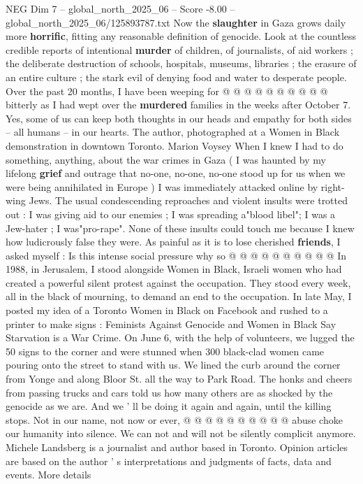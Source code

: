 \begin{textsample}{NEG Dim 7 – global\_north\_2025\_06 – Score -8.00 – global\_north\_2025\_06/125893787.txt}
Now the \textbf{slaughter} in Gaza grows daily more \textbf{horrific}, fitting any reasonable definition of genocide.
Look at the countless credible reports of intentional \textbf{murder} of children, of journalists, of aid workers ; the deliberate destruction of schools, hospitals, museums, libraries ; the erasure of an entire culture ; the stark evil of denying food and water to desperate people.
Over the past 20 months, I have been weeping for @ @ @ @ @ @ @ @ @ @ bitterly as I had wept over the \textbf{murdered} families in the weeks after October 7.
Yes, some of us can keep both thoughts in our heads and empathy for both sides -- all humans -- in our hearts.
The author, photographed at a Women in Black demonstration in downtown Toronto.
Marion Voysey When I knew I had to do something, anything, about the war crimes in Gaza ( I was haunted by my lifelong \textbf{grief} and outrage that no-one, no-one, no-one stood up for us when we were being annihilated in Europe ) I was immediately attacked online by right-wing Jews.
The usual condescending reproaches and violent insults were trotted out : I was giving aid to our enemies ; I was spreading a"blood libel"; I was a Jew-hater ; I was"pro-rape".
None of these insults could touch me because I knew how ludicrously false they were.
As painful as it is to lose cherished \textbf{friends}, I asked myself : Is this intense social pressure why so @ @ @ @ @ @ @ @ @ @ In 1988, in Jerusalem, I stood alongside Women in Black, Israeli women who had created a powerful silent protest against the occupation.
They stood every week, all in the black of mourning, to demand an end to the occupation.
In late May, I posted my idea of a Toronto Women in Black on Facebook and rushed to a printer to make signs : Feminists Against Genocide and Women in Black Say Starvation is a War Crime.
On June 6, with the help of volunteers, we lugged the 50 signs to the corner and were stunned when 300 black-clad women came pouring onto the street to stand with us.
We lined the curb around the corner from Yonge and along Bloor St. all the way to Park Road.
The honks and cheers from passing trucks and cars told us how many others are as shocked by the genocide as we are.
And we ' ll be doing it again and again, until the killing stops.
Not in our name, not now or ever, @ @ @ @ @ @ @ @ @ @ abuse choke our humanity into silence.
We can not and will not be silently complicit anymore.
Michele Landsberg is a journalist and author based in Toronto.
Opinion articles are based on the author ' s interpretations and judgments of facts, data and events.
More details

\end{textsample}
